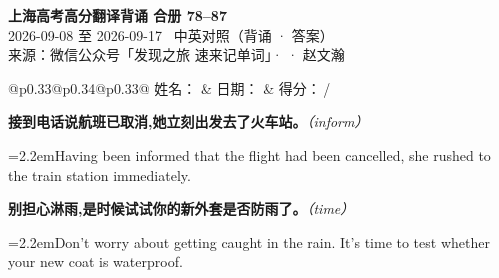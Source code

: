 \documentclass[11pt,a4paper]{article}
\newcommand{\num}[1]{\makebox[1.9em][r]{#1.}\hspace{0.3em}}
\newcommand{\prompt}[1]{\emph{\textcolor{tipblue}{\small（#1）}}}
\begin{document}
\pagestyle{plain}
\begin{center}
{\LARGE\bfseries 上海高考高分翻译背诵 \quad 合册 78–87}\\[0.25em]
{\large 2026-09-08 至 2026-09-17 \quad\ 中英对照（背诵 · 答案）}\\[0.35em]
{\footnotesize 来源：微信公众号「发现之旅 速来记单词」·  · 赵文瀚}
\end{center}

\vspace{0.4em}
\noindent\begin{tabular}{@{}p{0.33\textwidth}@{}p{0.34\textwidth}@{}p{0.33\textwidth}@{}}
姓名：\underline{\hspace{2.0cm}} & 日期：\underline{\hspace{2.0cm}} & 得分：\underline{\hspace{1.4cm}}\,/ \\
\end{tabular}

\vspace{0.5em}

\vspace{0.8em}
\vspace{0.35em}\vspace{0.15em}

\begin{minipage}{\linewidth}

\num{1}\textbf{接到电话说航班已取消,她立刻出发去了火车站。}\prompt{inform}

\vspace{0.15em}

\noindent\hangindent=2.2em\hspace{2.2em}Having been informed that the flight had been cancelled, she rushed to the train station immediately.

\end{minipage}

\begin{minipage}{\linewidth}

\num{2}\textbf{别担心淋雨,是时候试试你的新外套是否防雨了。}\prompt{time}

\vspace{0.15em}

\noindent\hangindent=2.2em\hspace{2.2em}Don’t worry about getting caught in the rain. It’s time to test whether your new coat is waterproof.

\end{minipage}
\end{document}
